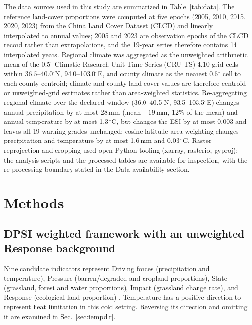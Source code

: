 \documentclass[preprint,11pt,authoryear]{elsarticle}
\begin{document}
The data sources used in this study are summarized in Table~\ref{tab:data}. The reference land-cover proportions were computed at five epochs (2005, 2010, 2015, 2020, 2023) from the China Land Cover Dataset (CLCD) \citep{yang2021clcd,yang2024clcd} and linearly interpolated to annual values; 2005 and 2023 are observation epochs of the CLCD record rather than extrapolations, and the 19-year series therefore contains 14 interpolated years. Regional climate was aggregated as the unweighted arithmetic mean of the 0.5$^\circ$ Climatic Research Unit Time Series (CRU TS) 4.10 grid cells within 36.5--40.0$^\circ$N, 94.0--103.0$^\circ$E, and county climate as the nearest 0.5$^\circ$ cell to each county centroid; climate and county land-cover values are therefore centroid or unweighted-grid estimates rather than area-weighted statistics. Re-aggregating regional climate over the declared window (36.0--40.5$^\circ$N, 93.5--103.5$^\circ$E) changes annual precipitation by at most 28\,mm (mean $-19$\,mm, 12\% of the mean) and annual temperature by at most 1.3\,$^{\circ}$C, but changes the ESI by at most 0.003 and leaves all 19 warning grades unchanged; cosine-latitude area weighting changes precipitation and temperature by at most 1.6\,mm and 0.03\,$^{\circ}$C. Raster reprojection and cropping used open Python tooling (xarray, rasterio, pyproj); the analysis scripts and the processed tables are available for inspection, with the re-processing boundary stated in the Data availability section.

\section{Methods}
\label{sec:method}

\subsection{DPSI weighted framework with an unweighted Response background}
\label{sec:dpsir}
Nine candidate indicators represent Driving forces (precipitation and temperature), Pressure (barren/degraded and cropland proportions), State (grassland, forest and water proportions), Impact (grassland change rate), and Response (ecological land proportion) \citep{changbai_dpsirm_2024,dpsir_dea_threegorges2023}. Temperature has a positive direction to represent heat limitation in this cold setting. Reversing its direction and omitting it are examined in Sec.~\ref{sec:tempdir}.
\end{document}
